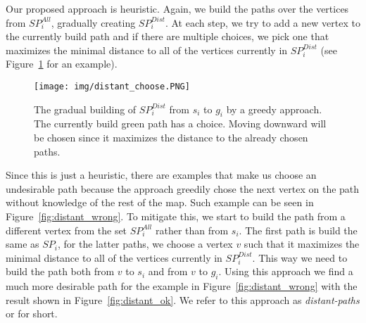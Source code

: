Our proposed approach is heuristic. Again, we build the paths over the vertices from $SP_i^{\mathit{All}}$, gradually creating $SP_i^{\mathit{Dist}}$. At each step, we try to add a new vertex to the currently build path and if there are multiple choices, we pick one that maximizes the minimal distance to all of the vertices currently in $SP_i^{\mathit{Dist}}$ (see Figure~\ref{fig:distant_choose} for an example).
%
\begin{figure}[ht]
\centering
\texttt{[image: img/distant\_choose.PNG]}
\caption{The gradual building of $SP_i^{\mathit{Dist}}$ from $s_i$ to $g_i$ by a greedy approach. The currently build green path has a choice. Moving downward will be chosen since it maximizes the distance to the already chosen paths.}
\label{fig:distant_choose}
\end{figure}
%
Since this is just a heuristic, there are examples that make us choose an undesirable path because the approach greedily chose the next vertex on the path without knowledge of the rest of the map. Such example can be seen in Figure~\ref{fig:distant_wrong}. To mitigate this, we start to build the path from a different vertex from the set $SP_i^{\mathit{All}}$ rather than from $s_i$. The first path is build the same as $SP_i$, for the latter paths, we choose a vertex $v$ such that it maximizes the minimal distance to all of the vertices currently in $SP_i^{\mathit{Dist}}$. This way we need to build the path both from $v$ to $s_i$ and from $v$ to $g_i$. Using this approach we find a much more desirable path for the example in Figure~\ref{fig:distant_wrong} with the result shown in Figure~\ref{fig:distant_ok}. We refer to this approach as \emph{distant-paths} or \psd{} for short.

